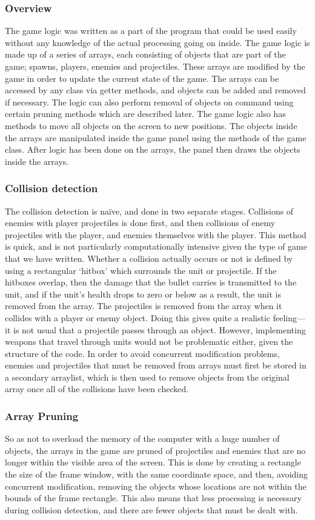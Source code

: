 \subsubsection{Overview}
The game logic was written as a part of the program that could be used easily without any knowledge of the actual processing going on inside. The game logic is made up of a series of arrays, each consisting of objects that are part of the game; spawns, players, enemies and projectiles. These arrays are modified by the game in order to update the current state of the game. The arrays can be accessed by any class via getter methods, and objects can be added and removed if necessary. The logic can also perform removal of objects on command using certain pruning methods which are described later. The game logic also has methods to move all objects on the screen to new positions. The objects inside the arrays are manipulated inside the game panel using the methods of the game class. After logic has been done on the arrays, the panel then draws the objects inside the arrays.
\subsubsection{Collision detection}
The collision detection is na\"{i}ve, and done in two separate stages. Collisions of enemies with player projectiles is done first, and then collisions of enemy projectiles with the player, and enemies themselves with the player. This method is quick, and is not particularly computationally intensive given the type of game that we have written. Whether a collision actually occurs or not is defined by using a rectangular `hitbox' which surrounds the unit or projectile. If the hitboxes overlap, then the damage that the bullet carries is transmitted to the unit, and if the unit's health drops to zero or below as a result, the unit is removed from the array. The projectiles is removed from the array when it collides with a player or enemy object. Doing this gives quite a realistic feeling---it is not usual that a projectile passes through an object. However, implementing weapons that travel through units would not be problematic either, given the structure of the code. In order to avoid concurrent modification problems, enemies and projectiles that must be removed from arrays must first be stored in a secondary arraylist, which is then used to remove objects from the original array once all of the collisions have been checked.
\subsubsection{Array Pruning}
So as not to overload the memory of the computer with a huge number of objects, the arrays in the game are pruned of projectiles and enemies that are no longer within the visible area of the screen. This is done by creating a rectangle the size of the frame window, with the same coordinate space, and then, avoiding concurrent modification, removing the objects whose locations are not within the bounds of the frame rectangle. This also means that less processing is necessary during collision detection, and there are fewer objects that must be dealt with.
